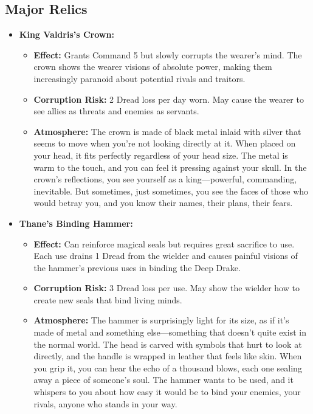 \documentclass[11pt]{article}
\begin{document}
\subsection{Major Relics}
\begin{itemize}
\item \textbf{King Valdris's Crown:} 
  \begin{itemize}
  \item \textbf{Effect:} Grants Command 5 but slowly corrupts the wearer's mind. The crown shows the wearer visions of absolute power, making them increasingly paranoid about potential rivals and traitors.
  \item \textbf{Corruption Risk:} 2 Dread loss per day worn. May cause the wearer to see allies as threats and enemies as servants.
  \item \textbf{Atmosphere:} The crown is made of black metal inlaid with silver that seems to move when you're not looking directly at it. When placed on your head, it fits perfectly regardless of your head size. The metal is warm to the touch, and you can feel it pressing against your skull. In the crown's reflections, you see yourself as a king---powerful, commanding, inevitable. But sometimes, just sometimes, you see the faces of those who would betray you, and you know their names, their plans, their fears.
  \end{itemize}
\item \textbf{Thane's Binding Hammer:} 
  \begin{itemize}
  \item \textbf{Effect:} Can reinforce magical seals but requires great sacrifice to use. Each use drains 1 Dread from the wielder and causes painful visions of the hammer's previous uses in binding the Deep Drake.
  \item \textbf{Corruption Risk:} 3 Dread loss per use. May show the wielder how to create new seals that bind living minds.
  \item \textbf{Atmosphere:} The hammer is surprisingly light for its size, as if it's made of metal and something else---something that doesn't quite exist in the normal world. The head is carved with symbols that hurt to look at directly, and the handle is wrapped in leather that feels like skin. When you grip it, you can hear the echo of a thousand blows, each one sealing away a piece of someone's soul. The hammer wants to be used, and it whispers to you about how easy it would be to bind your enemies, your rivals, anyone who stands in your way.
  \end{itemize}

\end{itemize}
\end{document}
